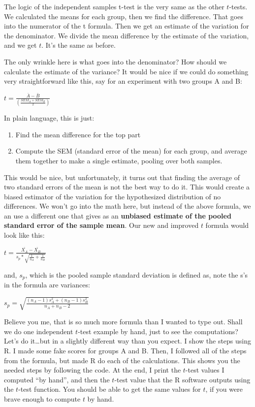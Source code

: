 \documentclass[
]{book}
\providecommand{\tightlist}{%
  \setlength{\itemsep}{0pt}\setlength{\parskip}{0pt}}
\begin{document}
The logic of the independent samples t-test is the very same as the other \(t\)-tests. We calculated the means for each group, then we find the difference. That goes into the numerator of the t formula. Then we get an estimate of the variation for the denominator. We divide the mean difference by the estimate of the variation, and we get \(t\). It's the same as before.

The only wrinkle here is what goes into the denominator? How should we calculate the estimate of the variance? It would be nice if we could do something very straightforward like this, say for an experiment with two groups A and B:

\(t = \frac{\bar{A}-\bar{B}}{(\frac{SEM_A+SEM_B}{2})}\)

In plain language, this is just:

\begin{enumerate}
\def\labelenumi{\arabic{enumi}.}
\tightlist
\item
  Find the mean difference for the top part
\item
  Compute the SEM (standard error of the mean) for each group, and average them together to make a single estimate, pooling over both samples.
\end{enumerate}

This would be nice, but unfortunately, it turns out that finding the average of two standard errors of the mean is not the best way to do it. This would create a biased estimator of the variation for the hypothesized distribution of no differences. We won't go into the math here, but instead of the above formula, we an use a different one that gives as an \textbf{unbiased estimate of the pooled standard error of the sample mean}. Our new and improved \(t\) formula would look like this:

\(t = \frac{\bar{X_A}-\bar{X_B}}{s_p * \sqrt{\frac{1}{n_A} + \frac{1}{n_B}}}\)

and, \(s_p\), which is the pooled sample standard deviation is defined as, note the s's in the formula are variances:

\(s_p = \sqrt{\frac{(n_A-1)s_A^2 + (n_B-1)s^2_B}{n_A +n_B -2}}\)

Believe you me, that is so much more formula than I wanted to type out. Shall we do one independent \(t\)-test example by hand, just to see the computations? Let's do it\ldots but in a slightly different way than you expect. I show the steps using R. I made some fake scores for groups A and B. Then, I followed all of the steps from the formula, but made R do each of the calculations. This shows you the needed steps by following the code. At the end, I print the \(t\)-test values I computed ``by hand'', and then the \(t\)-test value that the R software outputs using the \(t\)-test function. You should be able to get the same values for \(t\), if you were brave enough to compute \(t\) by hand.
\end{document}
